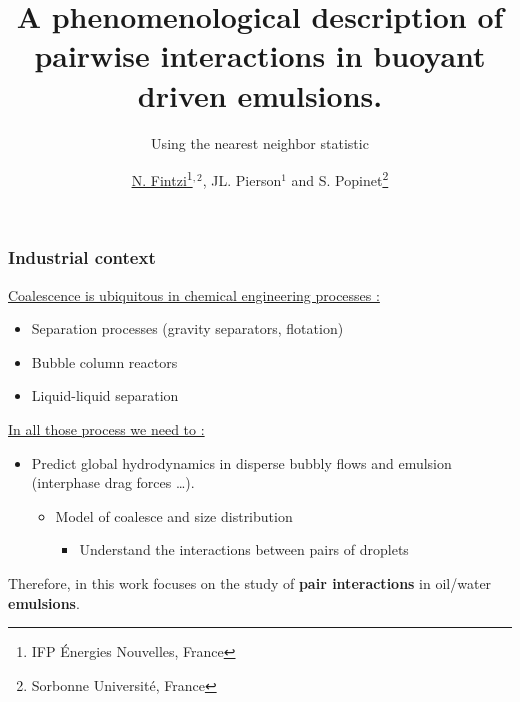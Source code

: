 \documentclass{sintefbeamer}
\title{A phenomenological description of pairwise interactions in buoyant driven emulsions.}
\subtitle{Using the nearest neighbor statistic}
\author{\href{http://basilisk.fr/sandbox/fintzin/Rising-Suspenion/RS.c}{\underline{N. Fintzi}\footnote{IFP \'Energies Nouvelles, France}$^{,2}$}, JL. Pierson$^1$ and S. Popinet\footnote{Sorbonne Universit\'e, France}}
\begin{document}
\maketitle

\begin{frame}
  \frametitle{Industrial context}
  \underline{Coalescence is ubiquitous in chemical engineering processes :}
  \begin{itemize}
    \item Separation processes (gravity separators, flotation)
    \item Bubble column reactors
    \item Liquid-liquid separation
  \end{itemize}
  \vfill
  \underline{In all those process we need to : }
  \begin{itemize}
    \item Predict global hydrodynamics in disperse bubbly flows and emulsion (interphase drag forces \ldots).
    \begin{itemize}
      \item Model of coalesce and size distribution 
      \begin{itemize}
        \item Understand the interactions between pairs of droplets
      \end{itemize}
    \end{itemize}
  \end{itemize}

  \vfill
  Therefore, in this work focuses on the study of \textbf{pair interactions} in oil/water \textbf{emulsions}.
\end{frame}


  

\end{document}
